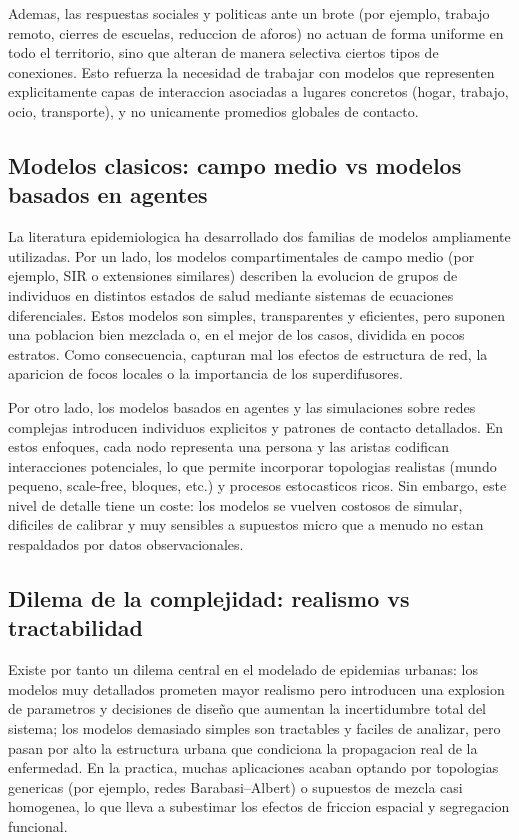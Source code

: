 Ademas, las respuestas sociales y politicas ante un brote (por ejemplo, trabajo remoto, cierres de escuelas, reduccion de aforos) no actuan de forma uniforme en todo el territorio, sino que alteran de manera selectiva ciertos tipos de conexiones. Esto refuerza la necesidad de trabajar con modelos que representen explicitamente capas de interaccion asociadas a lugares concretos (hogar, trabajo, ocio, transporte), y no unicamente promedios globales de contacto.

\subsection{Modelos clasicos: campo medio vs modelos basados en agentes}

La literatura epidemiologica ha desarrollado dos familias de modelos ampliamente utilizadas. Por un lado, los modelos compartimentales de campo medio (por ejemplo, SIR o extensiones similares) describen la evolucion de grupos de individuos en distintos estados de salud mediante sistemas de ecuaciones diferenciales. Estos modelos son simples, transparentes y eficientes, pero suponen una poblacion bien mezclada o, en el mejor de los casos, dividida en pocos estratos. Como consecuencia, capturan mal los efectos de estructura de red, la aparicion de focos locales o la importancia de los superdifusores.

Por otro lado, los modelos basados en agentes y las simulaciones sobre redes complejas introducen individuos explicitos y patrones de contacto detallados. En estos enfoques, cada nodo representa una persona y las aristas codifican interacciones potenciales, lo que permite incorporar topologias realistas (mundo pequeno, scale-free, bloques, etc.) y procesos estocasticos ricos. Sin embargo, este nivel de detalle tiene un coste: los modelos se vuelven costosos de simular, dificiles de calibrar y muy sensibles a supuestos micro que a menudo no estan respaldados por datos observacionales.

\subsection{Dilema de la complejidad: realismo vs tractabilidad}

Existe por tanto un dilema central en el modelado de epidemias urbanas: los modelos muy detallados prometen mayor realismo pero introducen una explosion de parametros y decisiones de diseño que aumentan la incertidumbre total del sistema; los modelos demasiado simples son tractables y faciles de analizar, pero pasan por alto la estructura urbana que condiciona la propagacion real de la enfermedad. En la practica, muchas aplicaciones acaban optando por topologias genericas (por ejemplo, redes Barabasi–Albert) o supuestos de mezcla casi homogenea, lo que lleva a subestimar los efectos de friccion espacial y segregacion funcional.

